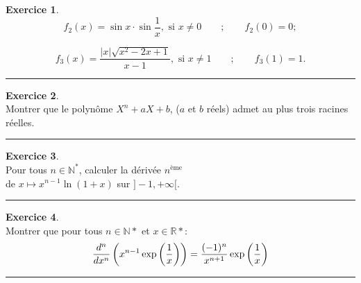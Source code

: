 \documentclass[a4paper,10pt]{article}
\theoremstyle{definition}
\theoremstyle{definition}
\newtheorem{exo}{Exercice}
\newcommand{\R}{\mathbb{R}}
\newcommand{\N}{\mathbb{N}}
\begin{document}
\begin{minipage}{1\linewidth}
\begin{minipage}[t]{0.48\linewidth}
\begin{exo}
$$f_2(x)= \sin x \cdot \sin \frac{1}{x}, \text{\ \  si }x\not=0 \qquad ; \qquad f_2(0)=0 ;$$

$$f_3(x) = \frac{|x|\sqrt{x^2-2x+1}}{x-1}, \text{\ \  si } x\not= 1 \qquad ; \qquad f_3(1)=1.$$
\centering\rule{1\linewidth}{0.6pt}
\end{exo}

\begin{exo}\quad\\
Montrer que le polyn\^ome $  X^n+aX+b  $,  ($  a  $ et $  b  $ r\' eels) admet au plus trois racines r\' eelles.

\centering\rule{1\linewidth}{0.6pt}
\end{exo}

\begin{exo}\quad\\
Pour tous $n\in\N^*$, calculer la dérivée $n^{\text{ème}}$ \\de $x \mapsto  x^{n-1}\ln(1+x)$ sur $]-1,+\infty[$.

\centering\rule{1\linewidth}{0.6pt}
\end{exo}

\begin{exo}\quad\\
Montrer que pour tous $n\in\N*$ et $x\in\R*$:
$$\dfrac{d^n}{dx^n}\left(x^{n-1} \exp\left(\tiny\dfrac{1}{x}\right)\right) = \dfrac{(-1)^n}{x^{n+1}} \exp\left(\tiny\dfrac{1}{x}\right)$$

\centering\rule{1\linewidth}{0.6pt}
\end{exo}
\end{minipage}
\end{minipage}
\end{document}
